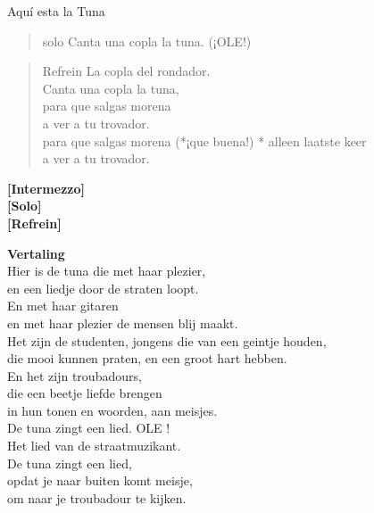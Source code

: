\begin{song}{Aquí esta la Tuna}
\begin{verse}{solo}
Canta una copla la tuna. (¡OLE!)
\end{verse}
\clearpage
\begin{verse}{Refrein}
\hspace{1em}La copla del rondador.\\
Canta una copla la tuna,\\
para que salgas morena\\
a ver a tu trovador.\\
para que salgas morena (*¡que buena!)\hspace{2em} * alleen laatste keer\\
a ver a tu trovador.\hspace{1em}
\end{verse}

\textbf{[Intermezzo]}\\
\textbf{[Solo]}\\
\textbf{[Refrein]}\\
\end{song}
\textbf{Vertaling}\\
Hier is de tuna die met haar plezier,\\
en een liedje door de straten loopt.\\
En met haar gitaren\\
en met haar plezier de mensen blij maakt.\\\vspace{1em}
Het zijn de studenten, jongens die van een geintje houden,\\
die mooi kunnen praten, en een groot hart hebben.\\
En het zijn troubadours,\\
die een beetje liefde brengen\\
in hun tonen en woorden, aan meisjes.\\\vspace{1em}
De tuna zingt een lied. OLE !\\\vspace{1em}
Het lied van de straatmuzikant.\\
De tuna zingt een lied,\\
opdat je naar buiten komt meisje,\\
om naar je troubadour te kijken.
